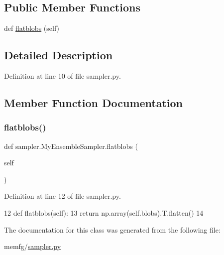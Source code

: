 \subsection*{Public Member Functions}
\begin{DoxyCompactItemize}
\item 
def \hyperlink{classsampler_1_1MyEnsembleSampler_ac34b6015678d38beabdd30cbfd7fbfaf}{flatblobs} (self)
\end{DoxyCompactItemize}


\subsection{Detailed Description}


Definition at line 10 of file sampler.\+py.



\subsection{Member Function Documentation}
\mbox{\label{classsampler_1_1MyEnsembleSampler_ac34b6015678d38beabdd30cbfd7fbfaf}} 
\subsubsection{\texorpdfstring{flatblobs()}{flatblobs()}}
{\footnotesize\ttfamily def sampler.\+My\+Ensemble\+Sampler.\+flatblobs (\begin{DoxyParamCaption}\item[{}]{self }\end{DoxyParamCaption})}



Definition at line 12 of file sampler.\+py.


\begin{DoxyCode}
12     \textcolor{keyword}{def }flatblobs(self):
13         \textcolor{keywordflow}{return} np.array(self.blobs).T.flatten()
14 
\end{DoxyCode}


The documentation for this class was generated from the following file\+:\begin{DoxyCompactItemize}
\item 
memfg/\hyperlink{sampler_8py}{sampler.\+py}\end{DoxyCompactItemize}
